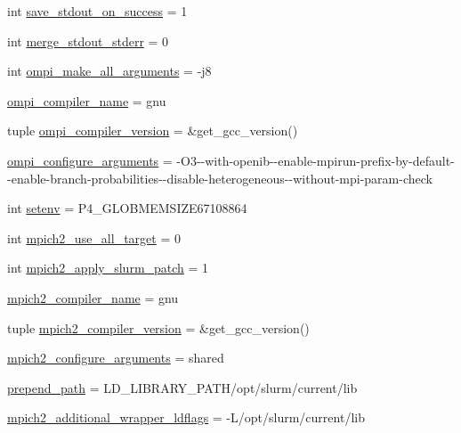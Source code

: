 \begin{DoxyCompactItemize}
\item 
int \hyperlink{namespaceompi-core-perf-testing_a5b495b6fffd94577499d4288abc7839b}{save\-\_\-stdout\-\_\-on\-\_\-success} = 1
\item 
int \hyperlink{namespaceompi-core-perf-testing_ac489ea5e767b62f66a2b4a1b28758af2}{merge\-\_\-stdout\-\_\-stderr} = 0
\item 
int \hyperlink{namespaceompi-core-perf-testing_a226230ce64cc634de35c2f12abdd54f2}{ompi\-\_\-make\-\_\-all\-\_\-arguments} = -\/j8
\item 
\hyperlink{namespaceompi-core-perf-testing_adcf0f97184536c2477a499f2db08f783}{ompi\-\_\-compiler\-\_\-name} = gnu
\item 
tuple \hyperlink{namespaceompi-core-perf-testing_a6bc0385f02dc808bb726283b67157b17}{ompi\-\_\-compiler\-\_\-version} = \&get\-\_\-gcc\-\_\-version()
\item 
\hyperlink{namespaceompi-core-perf-testing_a5417df6f672d37ff96b65443a6b2a147}{ompi\-\_\-configure\-\_\-arguments} = -\/O3-\/-\/with-\/openib-\/-\/enable-\/mpirun-\/prefix-\/by-\/default-\/-\/enable-\/branch-\/probabilities-\/-\/disable-\/heterogeneous-\/-\/without-\/mpi-\/param-\/check
\item 
int \hyperlink{namespaceompi-core-perf-testing_a1edb160fbade0abbd90944224c10612e}{setenv} = P4\-\_\-\-G\-L\-O\-B\-M\-E\-M\-S\-I\-Z\-E67108864
\item 
int \hyperlink{namespaceompi-core-perf-testing_aee0e6469e24a5453a105598477ece09c}{mpich2\-\_\-use\-\_\-all\-\_\-target} = 0
\item 
int \hyperlink{namespaceompi-core-perf-testing_a1ef643f02998e769b3601fe0312d35a2}{mpich2\-\_\-apply\-\_\-slurm\-\_\-patch} = 1
\item 
\hyperlink{namespaceompi-core-perf-testing_a514348840ab2f20da080b7ea0d9b7f73}{mpich2\-\_\-compiler\-\_\-name} = gnu
\item 
tuple \hyperlink{namespaceompi-core-perf-testing_a8bf80d7842612f727f0c9d47f51407e5}{mpich2\-\_\-compiler\-\_\-version} = \&get\-\_\-gcc\-\_\-version()
\item 
\hyperlink{namespaceompi-core-perf-testing_a7215b7a4babaf7f8f2c9f588168f9b18}{mpich2\-\_\-configure\-\_\-arguments} = shared
\item 
\hyperlink{namespaceompi-core-perf-testing_af79469a4a6041fcd16be3bde9d09e109}{prepend\-\_\-path} = L\-D\-\_\-\-L\-I\-B\-R\-A\-R\-Y\-\_\-\-P\-A\-T\-H/opt/slurm/current/lib
\item 
\hyperlink{namespaceompi-core-perf-testing_af90676eacbf08c8cdca48d2e50078288}{mpich2\-\_\-additional\-\_\-wrapper\-\_\-ldflags} = -\/L/opt/slurm/current/lib

\end{DoxyCompactItemize}

